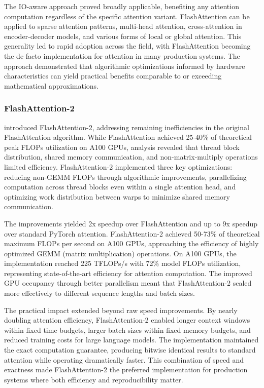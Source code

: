 \documentclass[11pt,letterpaper]{article}
\begin{document}
The IO-aware approach proved broadly applicable, benefiting any attention computation regardless of the specific attention variant. FlashAttention can be applied to sparse attention patterns, multi-head attention, cross-attention in encoder-decoder models, and various forms of local or global attention. This generality led to rapid adoption across the field, with FlashAttention becoming the de facto implementation for attention in many production systems. The approach demonstrated that algorithmic optimizations informed by hardware characteristics can yield practical benefits comparable to or exceeding mathematical approximations.

\subsubsection{FlashAttention-2}

\cite{dao2023flashattention2} introduced FlashAttention-2, addressing remaining inefficiencies in the original FlashAttention algorithm. While FlashAttention achieved 25-40\% of theoretical peak FLOPs utilization on A100 GPUs, analysis revealed that thread block distribution, shared memory communication, and non-matrix-multiply operations limited efficiency. FlashAttention-2 implemented three key optimizations: reducing non-GEMM FLOPs through algorithmic improvements, parallelizing computation across thread blocks even within a single attention head, and optimizing work distribution between warps to minimize shared memory communication.

The improvements yielded 2x speedup over FlashAttention and up to 9x speedup over standard PyTorch attention. FlashAttention-2 achieved 50-73\% of theoretical maximum FLOPs per second on A100 GPUs, approaching the efficiency of highly optimized GEMM (matrix multiplication) operations. On A100 GPUs, the implementation reached 225 TFLOPs/s with 72\% model FLOPs utilization, representing state-of-the-art efficiency for attention computation. The improved GPU occupancy through better parallelism meant that FlashAttention-2 scaled more effectively to different sequence lengths and batch sizes.

The practical impact extended beyond raw speed improvements. By nearly doubling attention efficiency, FlashAttention-2 enabled longer context windows within fixed time budgets, larger batch sizes within fixed memory budgets, and reduced training costs for large language models. The implementation maintained the exact computation guarantee, producing bitwise identical results to standard attention while operating dramatically faster. This combination of speed and exactness made FlashAttention-2 the preferred implementation for production systems where both efficiency and reproducibility matter.
\end{document}
